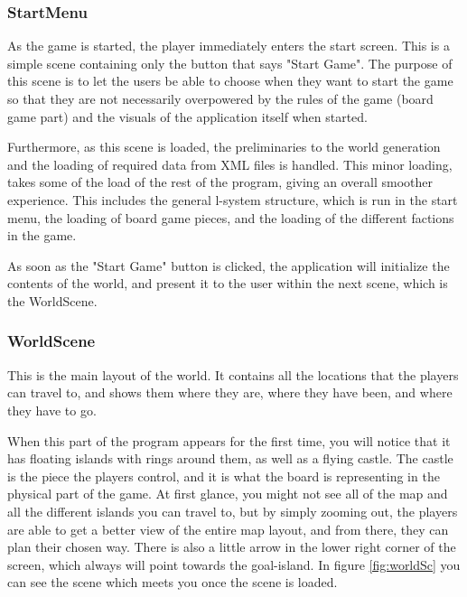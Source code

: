 \subsubsection{StartMenu}
As the game is started, the player immediately enters the start screen. This is a simple scene containing only the button that says "Start Game". The purpose of this scene is to let the users be able to choose when they want to start the game so that they are not necessarily overpowered by the rules of the game (board game part) and the visuals of the application itself when started.

Furthermore, as this scene is loaded, the preliminaries to the world generation and the loading of required data from XML files is handled. This minor loading, takes some of the load of the rest of the program, giving an overall smoother experience.
This includes the general l-system structure, which is run in the start menu, the loading of board game pieces, and the loading of the different factions in the game.

As soon as the "Start Game" button is clicked, the application will initialize the contents of the world, and present it to the user within the next scene, which is the WorldScene.

\subsubsection{WorldScene}
\label{sec:worldscene}
This is the main layout of the world. It contains all the locations that the players can travel to, and shows them where they are, where they have been, and where they have to go.

When this part of the program appears for the first time, you will notice that it has floating islands with rings around them, as well as a flying castle. The castle is the piece the players control, and it is what the board is representing in the physical part of the game.
At first glance, you might not see all of the map and all the different islands you can travel to, but by simply zooming out, the players are able to get a better view of the entire map layout, and from there, they can plan their chosen way. There is also a little arrow in the lower right corner of the screen, which always will point towards the goal-island. 
In figure \ref{fig:worldSc} you can see the scene which meets you once the scene is loaded.


